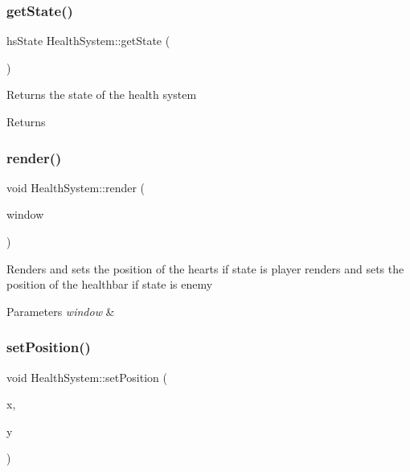 \subsubsection{\texorpdfstring{getState()}{getState()}}
{\footnotesize\ttfamily hs\+State Health\+System\+::get\+State (\begin{DoxyParamCaption}{ }\end{DoxyParamCaption})}



Returns the state of the health system 

\begin{DoxyReturn}{Returns}

\end{DoxyReturn}
\mbox{\label{class_health_system_ae0ef2aa8b9b040f3b973a3f220b5b19e}} 
\subsubsection{\texorpdfstring{render()}{render()}}
{\footnotesize\ttfamily void Health\+System\+::render (\begin{DoxyParamCaption}\item[{sf\+::\+Render\+Window \&}]{window }\end{DoxyParamCaption})}



Renders and sets the position of the hearts if state is player renders and sets the position of the healthbar if state is enemy 


\begin{DoxyParams}{Parameters}
{\em window} & \\
\hline
\end{DoxyParams}
\mbox{\label{class_health_system_ad07dc3ea58beaead2f660a8f11dc5997}} 
\subsubsection{\texorpdfstring{setPosition()}{setPosition()}}
{\footnotesize\ttfamily void Health\+System\+::set\+Position (\begin{DoxyParamCaption}\item[{float}]{x,  }\item[{float}]{y }\end{DoxyParamCaption})}




